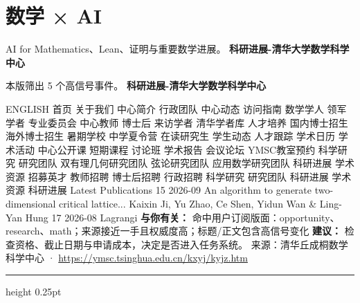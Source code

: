 \documentclass[10.5pt]{ctexart}
\begin{document}
\section*{数学 × AI}
{\color{ormuted} AI for Mathematics、Lean、证明与重要数学进展。}
\vspace{2mm}
{\LARGE\bfseries 科研进展-清华大学数学科学中心}\par
\vspace{1mm}
{\color{ormuted} 本版筛出 5 个高信号事件。}
\vspace{3mm}
{\Large\bfseries 科研进展-清华大学数学科学中心}\par
ENGLISH 首页 关于我们 中心简介 行政团队 中心动态 访问指南 数学学人 领军学者 专业委员会 中心教师 博士后 来访学者 清华学者库 人才培养 国内博士招生 海外博士招生 暑期学校 中学夏令营 在读研究生 学生动态 人才跟踪 学术日历 学术活动 中心公开课 短期课程 讨论班 学术报告 会议论坛 YMSC教室预约 科学研究 研究团队 双有理几何研究团队 弦论研究团队 应用数学研究团队 科研进展 学术资源 招募英才 教师招聘 博士后招聘 行政招聘 科学研究 研究团队 科研进展 学术资源 科研进展 Latest Publications 15 2026-09 An algorithm to generate two-dimensional critical lattice... Kaixin Ji, Yu Zhao, Ce Shen, Yidun Wan \& Ling-Yan Hung 17 2026-08 Lagrangi
\textbf{与你有关：} 命中用户订阅版面：opportunity、research、math；来源接近一手且权威度高；标题/正文包含高信号变化
\textbf{建议：} 检查资格、截止日期与申请成本，决定是否进入任务系统。
{\footnotesize\color{ormuted} 来源：清华丘成桐数学科学中心 · \url{https://ymsc.tsinghua.edu.cn/kxyj/kyjz.htm}}
\vspace{4mm}
\hrule height 0.25pt
\vspace{3mm}
\end{document}
